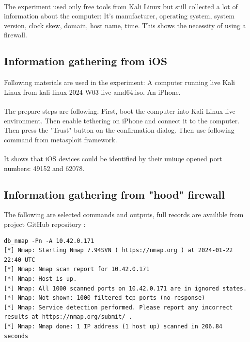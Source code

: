 \documentclass[mscthesis]{usiinfthesis}
\begin{document}
\paragraph{}
The experiment used only free tools from Kali Linux but still collected a lot of information about the computer: It's manufacturer, operating system, system version, clock skew, domain, host name, time. This shows the necessity of using a firewall.

\subsection{Information gathering from iOS}
\paragraph{}
Following materials are used in the experiment: A computer running live Kali Linux from kali-linux-2024-W03-live-amd64.iso. An iPhone.
\paragraph{}
The prepare steps are following. First, boot the computer into Kali Linux live environment. Then enable tethering on iPhone and connect it to the computer. Then press the "Trust" button on the confirmation dialog. Then use following command from metasploit framework.
\paragraph{}
It shows that iOS devices could be identified by their uniuqe opened port numbers: 49152 and 62078.

\subsection{Information gathering from "hood" firewall}
The following are selected commands and outputs, full records are availible from project GitHub repository \citep{hood:github}:

\begin{lstlisting}[language={},frame=single,breaklines=true,postbreak=\mbox{\textcolor{red}{$\hookrightarrow$}\space}]
db_nmap -Pn -A 10.42.0.171
[*] Nmap: Starting Nmap 7.94SVN ( https://nmap.org ) at 2024-01-22 22:40 UTC
[*] Nmap: Nmap scan report for 10.42.0.171
[*] Nmap: Host is up.
[*] Nmap: All 1000 scanned ports on 10.42.0.171 are in ignored states.
[*] Nmap: Not shown: 1000 filtered tcp ports (no-response)
[*] Nmap: Service detection performed. Please report any incorrect results at https://nmap.org/submit/ .
[*] Nmap: Nmap done: 1 IP address (1 host up) scanned in 206.84 seconds
\end{lstlisting}
\end{document}
